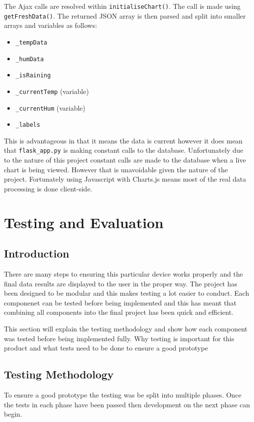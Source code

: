 \documentclass[10pt,a4paper]{article}
\begin{document}
The Ajax calls are resolved within \texttt{initialiseChart()}. The call is made using \texttt{getFreshData()}. The returned JSON array is then parsed and split into smaller arrays and variables as follows: 
\begin{itemize}
\item \texttt{\_tempData}
\item \texttt{\_humData}
\item \texttt{\_isRaining}
\item \texttt{\_currentTemp} (variable)
\item \texttt{\_currentHum} (variable)
\item \texttt{\_labels}
\end{itemize}

This is advantageous in that it means the data is current however it does mean that \texttt{flask\_app.py} is making constant calls to the database. Unfortunately due to the nature of this project constant calls are made to the database when a live chart is being viewed. However that is unavoidable given the nature of the project. Fortunately using Javascript with Charts.js means most of the real data processing is done client-side. 

\pagebreak
\section{Testing and Evaluation}
\subsection{Introduction}
There are many steps to ensuring this particular device works properly and the final data results are displayed to the user in the proper way. The project has been designed to be modular and this makes testing a lot easier to conduct. Each componenet can be tested before being implemented and this has meant that combining all components into the final project has been quick and efficient.

This section will explain the testing methodology and show how each component was tested before being implemented fully. 
Why testing is important for this product and what tests need to be done to ensure a good prototype
\subsection{Testing Methodology}
To ensure a good prototype the testing was be split into multiple phases. Once the tests in each phase have been passed then development on the next phase can begin.
\end{document}
